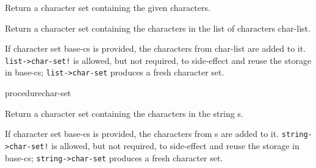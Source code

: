 \begin{entry}{%
  }

  Return a
  character set containing the given characters.
\end{entry}

\begin{entry}{%
  }

  Return a character set containing the
  characters in the list of characters char-list.

  If character set base-cs is provided, the characters from char-list
  are added to it. \texttt{list->char-set!} is allowed,
  but not required, to side-effect and reuse the storage in base-cs;
  \texttt{list->char-set} produces a fresh character set.    
\end{entry}

\begin{entry}{%
   {procedure}{char-set}}

  Return a character set containing the characters in the
  string s.

  If character set base-cs is provided, the characters from s are
  added to it. \texttt{string->char-set!} is allowed, but
  not required, to side-effect and reuse the storage in base-cs;
  \texttt{string->char-set} produces a fresh character
  set.    
\end{entry}

